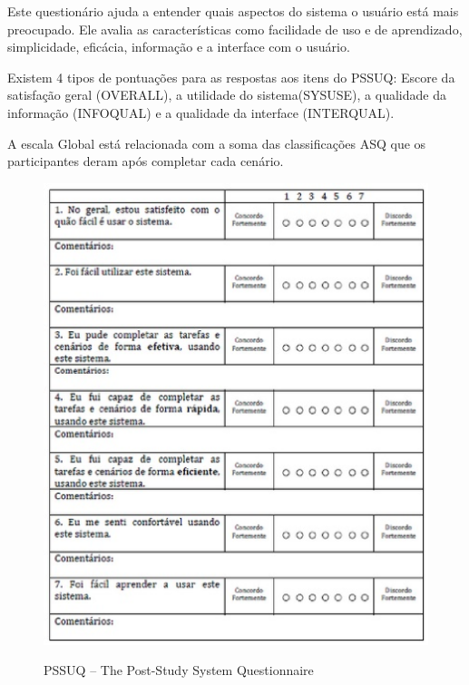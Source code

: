 	Este questionário ajuda a entender quais aspectos do sistema o usuário está mais preocupado. Ele avalia as características como facilidade de uso e de aprendizado, simplicidade, eficácia, informação e a interface com o usuário.

	Existem 4 tipos de pontuações para as respostas aos itens do PSSUQ: Escore da satisfação geral (OVERALL), a utilidade do sistema(SYSUSE), a qualidade da  informação (INFOQUAL) e a qualidade da interface (INTERQUAL). 

A escala Global está relacionada com a soma das classificações ASQ que os participantes deram após completar cada cenário. 


\begin{figure}[!h]
    \centering
    \includegraphics[keepaspectratio=true,scale=0.60]
      {figuras/pssuq01.eps}
    \label{pssuq}
	\caption{PSSUQ – The Post-Study System Questionnaire}
\end{figure}

\newpage


